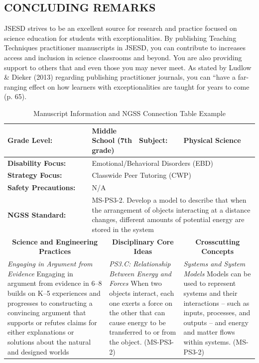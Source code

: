 \documentclass[11.5pt]{sig-alternate} %
\begin{document}
\begin{large}
\section*{CONCLUDING REMARKS}
JSESD strives to be an excellent source for research and practice focused on science education for students with exceptionalities.  By publishing Teaching Techniques practitioner manuscripts in JSESD, you can contribute to increases access and inclusion in science classrooms and beyond.  You are also providing support to others that and even those you may never meet.  As stated by Ludlow \& Dieker (2013) regarding publishing practitioner journals, you can “have a far-ranging effect on how learners with exceptionalities are taught for years to come (p. 65).
\clearpage

\begin{table}[!hbp]
\caption{Manuscript Information and NGSS Connection Table Example}
\begin{tabular}{|l|l|l|l|l|l|}
\hline
\textbf{Grade Level:} & \multicolumn{2}{l|}{Middle School (7th grade)} & \textbf{Subject:} & \multicolumn{2}{l|}{Physical Science} \\ \hline
\textbf{Disability Focus:} & \multicolumn{5}{l|}{Emotional/Behavioral Disorders (EBD)} \\ \hline
\textbf{Strategy Focus:} & \multicolumn{5}{l|}{Classwide Peer Tutoring (CWP)} \\ \hline
\textbf{Safety Precautions:} & \multicolumn{5}{l|}{N/A} \\ \hline
\textbf{NGSS Standard:} & \multicolumn{5}{l|}{MS-PS3-2. Develop a model to describe that when the arrangement of objects interacting at a distance changes, different amounts of potential energy are stored in the system} \\ \hline
\multicolumn{2}{|c|}{\textbf{Science and Engineering Practices}} & \multicolumn{2}{|c|}{\textbf{Disciplinary Core Ideas}} & \multicolumn{2}{|c|}{\textbf{Crosscutting Concepts}} \\ \hline
\multicolumn{2}{|l|}{{\textit{Engaging in Argument from Evidence} Engaging in argument from evidence in 6–8 builds on K–5 experiences and progresses to constructing a convincing argument that supports or refutes claims for either explanations or solutions about the natural and designed worlds}} & \multicolumn{2}{|l|}{{\textit{PS3.C: Relationship Between Energy and Forces} When two objects interact, each one exerts a force on the other that can cause energy to be transferred to or from the object. (MS-PS3-2)}} & \multicolumn{2}{|l|}{{\textit{Systems and System Models} Models can be used to represent systems and their interactions – such as inputs, processes, and outputs – and energy and matter flows within systems. (MS-PS3-2)}} \\ \hline
\end{tabular}
\end{table}


\end{large}
\end{document}
